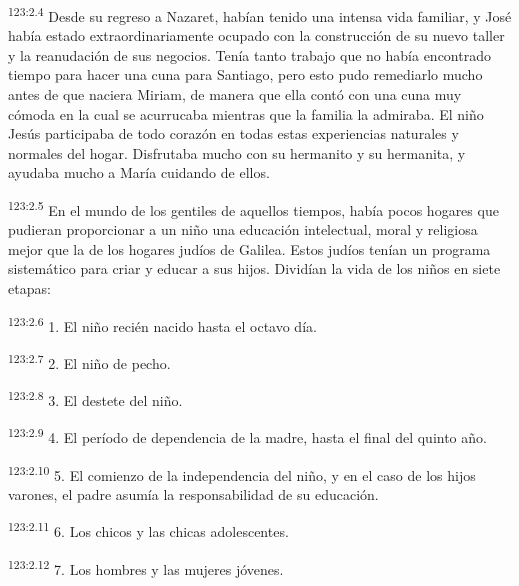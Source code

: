 \par
\textsuperscript{123:2.4} Desde su regreso a Nazaret, habían tenido una intensa vida familiar, y José había estado extraordinariamente ocupado con la construcción de su nuevo taller y la reanudación de sus negocios. Tenía tanto trabajo que no había encontrado tiempo para hacer una cuna para Santiago, pero esto pudo remediarlo mucho antes de que naciera Miriam, de manera que ella contó con una cuna muy cómoda en la cual se acurrucaba mientras que la familia la admiraba. El niño Jesús participaba de todo corazón en todas estas experiencias naturales y normales del hogar. Disfrutaba mucho con su hermanito y su hermanita, y ayudaba mucho a María cuidando de ellos.

\par
\textsuperscript{123:2.5} En el mundo de los gentiles de aquellos tiempos, había pocos hogares que pudieran proporcionar a un niño una educación intelectual, moral y religiosa mejor que la de los hogares judíos de Galilea. Estos judíos tenían un programa sistemático para criar y educar a sus hijos. Dividían la vida de los niños en siete etapas:

\par
\textsuperscript{123:2.6} 1. El niño recién nacido hasta el octavo día.

\par
\textsuperscript{123:2.7} 2. El niño de pecho.

\par
\textsuperscript{123:2.8} 3. El destete del niño.

\par
\textsuperscript{123:2.9} 4. El período de dependencia de la madre, hasta el final del quinto año.

\par
\textsuperscript{123:2.10} 5. El comienzo de la independencia del niño, y en el caso de los hijos varones, el padre asumía la responsabilidad de su educación.

\par
\textsuperscript{123:2.11} 6. Los chicos y las chicas adolescentes.

\par
\textsuperscript{123:2.12} 7. Los hombres y las mujeres jóvenes.

